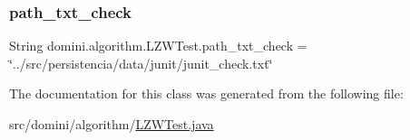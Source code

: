\subsubsection{\texorpdfstring{path\+\_\+txt\+\_\+check}{path\_txt\_check}}
{\footnotesize\ttfamily String domini.\+algorithm.\+L\+Z\+W\+Test.\+path\+\_\+txt\+\_\+check = \char`\"{}../src/persistencia/data/junit/junit\+\_\+check.\+txt\char`\"{}\hspace{0.3cm}{\ttfamily [private]}}



The documentation for this class was generated from the following file\+:\begin{DoxyCompactItemize}
\item 
src/domini/algorithm/\hyperlink{LZWTest_8java}{L\+Z\+W\+Test.\+java}\end{DoxyCompactItemize}
